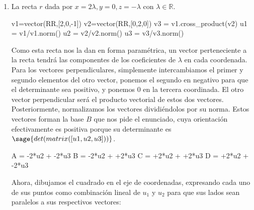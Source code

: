 \documentclass{amsart}
\begin{document}
\begin{enumerate}
\item La recta $r$ dada por $x = 2\lambda, y = 0, z = -\lambda$ con $\lambda \in {\mathbb R}$.

\begin{sageblock}
v1=vector(RR,[2,0,-1])
v2=vector(RR,[0,2,0])
v3 = v1.cross_product(v2)
u1 = v1/v1.norm()
u2 = v2/v2.norm()
u3 = v3/v3.norm()
\end{sageblock}

Como esta recta nos la dan en forma paramétrica, un vector perteneciente a la recta tendrá las componentes de los coeficientes de $\lambda$ en cada coordenada. 
Para los vectores perpendiculares, simplemente intercambiamos el primer y segundo elementos del otro vector, ponemos el segundo en negativo para que el determinante sea positivo, y ponemos 0 en la tercera coordinada. El otro vector perpendicular será el producto vectorial de estos dos vectores.\\
Posteriormente, normalizamos los vectores dividiéndolos por su norma. 
Estos vectores forman la base $B$ que nos pide el enunciado, cuya orientación efectivamente es positiva porque su determinante es $\sage{det(matrix([u1,u2,u3]))}$.

\begin{sageblock}
A = -2*u2 + -2*u3
B = -2*u2 + +2*u3
C = +2*u2 + +2*u3
D = +2*u2 + -2*u3
\end{sageblock}

Ahora, dibujamos el cuadrado en el eje de coordenadas, expresando cada uno de sus puntos como combinación lineal de $u_1$ y $u_2$ para que sus lados sean paralelos a sus respectivos vectores:

\begin{sagesub}
\begin{center}
\end{center}
\end{sagesub}
\end{enumerate}
\end{document}
